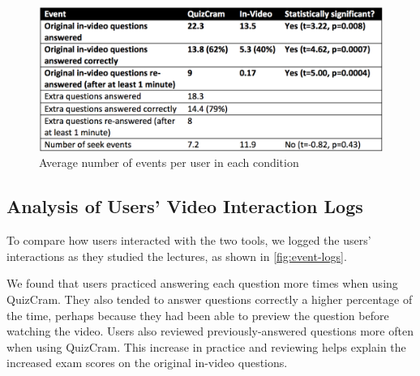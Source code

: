 \documentclass{sigchi}
\begin{document}
\begin{figure}
\centering
\includegraphics[width=1.0\columnwidth]{event-logs}
\caption{Average number of events per user in each condition}
\label{fig:event-logs}
\end{figure}

\subsection{Analysis of Users' Video Interaction Logs}


To compare how users interacted with the two tools, we logged the users' interactions as they studied the lectures, as shown in \autoref{fig:event-logs}.

We found that users practiced answering each question more times when using QuizCram. They also tended to answer questions correctly a higher percentage of the time, perhaps because they had been able to preview the question before watching the video. Users also reviewed previously-answered questions more often when using QuizCram. This increase in practice and reviewing helps explain the increased exam scores on the original in-video questions. %

\end{document}
